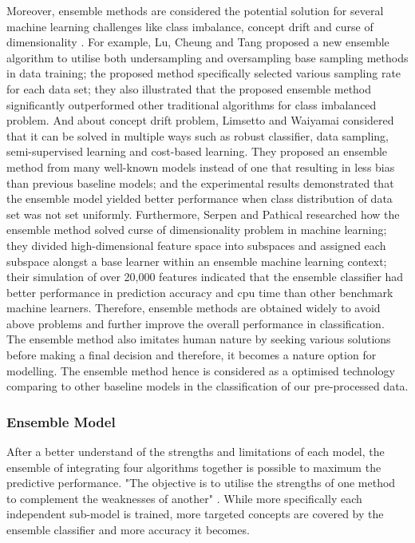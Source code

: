 \documentclass[12pt]{article}
\begin{document}
Moreover, ensemble methods are considered the potential solution for several machine learning challenges like class imbalance, concept drift and curse of dimensionality \cite{Sagi}. For example, Lu, Cheung and Tang \cite{Lu} proposed a new ensemble algorithm to utilise both undersampling and oversampling base sampling methods in data training; the proposed method specifically selected various sampling rate for each data set; they also illustrated that the proposed ensemble method significantly outperformed other traditional algorithms for class imbalanced problem. And about concept drift problem, Limsetto and Waiyamai \cite{Limsetto} considered that it can be solved in multiple ways such as robust classifier, data sampling, semi-supervised learning and cost-based learning. They proposed an ensemble method from many well-known models instead of one that resulting in less bias than previous baseline models; and the experimental results demonstrated that the ensemble model yielded better performance when class distribution of data set was not set uniformly. Furthermore, Serpen and Pathical \cite{Serpen} researched how the ensemble method solved curse of dimensionality problem in machine learning; they divided high-dimensional feature space into subspaces and assigned each subspace alongst a base learner within an ensemble machine learning context; their simulation of over 20,000 features indicated that the ensemble classifier had better performance in prediction accuracy and cpu time than other benchmark machine learners. Therefore, ensemble methods are obtained widely to avoid above problems and further improve the overall performance in classification.
\\

The ensemble method also imitates human nature by seeking various solutions before making a final decision \cite{Sagi} and therefore, it becomes a nature option for modelling. The ensemble method hence is considered as a optimised technology comparing to other baseline models in the classification of our pre-processed data.
\\
\smallskip

\subsubsection{Ensemble Model}
After a better understand of the strengths and limitations of each model, the ensemble of integrating four algorithms together is possible to maximum the predictive performance. "The objective is to utilise the strengths of one method to complement the weaknesses of another" \cite{Kotsiantis}. While more specifically each independent sub-model is trained, more targeted concepts are covered by the ensemble classifier and more accuracy it becomes. 
\\
\end{document}

